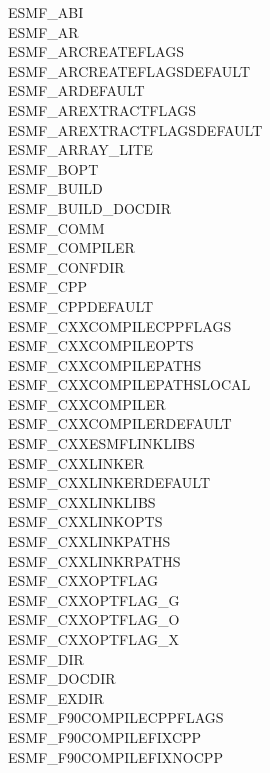 \begin{description}

\item[ESMF\_ABI]
\item[ESMF\_AR]
\item[ESMF\_ARCREATEFLAGS]
\item[ESMF\_ARCREATEFLAGSDEFAULT]
\item[ESMF\_ARDEFAULT]
\item[ESMF\_AREXTRACTFLAGS]
\item[ESMF\_AREXTRACTFLAGSDEFAULT]
\item[ESMF\_ARRAY\_LITE]
\item[ESMF\_BOPT]
\item[ESMF\_BUILD]
\item[ESMF\_BUILD\_DOCDIR]
\item[ESMF\_COMM]
\item[ESMF\_COMPILER]
\item[ESMF\_CONFDIR]
\item[ESMF\_CPP]
\item[ESMF\_CPPDEFAULT]
\item[ESMF\_CXXCOMPILECPPFLAGS]
\item[ESMF\_CXXCOMPILEOPTS]
\item[ESMF\_CXXCOMPILEPATHS]
\item[ESMF\_CXXCOMPILEPATHSLOCAL]
\item[ESMF\_CXXCOMPILER]
\item[ESMF\_CXXCOMPILERDEFAULT]
\item[ESMF\_CXXESMFLINKLIBS]
\item[ESMF\_CXXLINKER]
\item[ESMF\_CXXLINKERDEFAULT]
\item[ESMF\_CXXLINKLIBS]
\item[ESMF\_CXXLINKOPTS]
\item[ESMF\_CXXLINKPATHS]
\item[ESMF\_CXXLINKRPATHS]
\item[ESMF\_CXXOPTFLAG]
\item[ESMF\_CXXOPTFLAG\_G]
\item[ESMF\_CXXOPTFLAG\_O]
\item[ESMF\_CXXOPTFLAG\_X]
\item[ESMF\_DIR]
\item[ESMF\_DOCDIR]
\item[ESMF\_EXDIR]
\item[ESMF\_F90COMPILECPPFLAGS]
\item[ESMF\_F90COMPILEFIXCPP]
\item[ESMF\_F90COMPILEFIXNOCPP]

\end{description}
